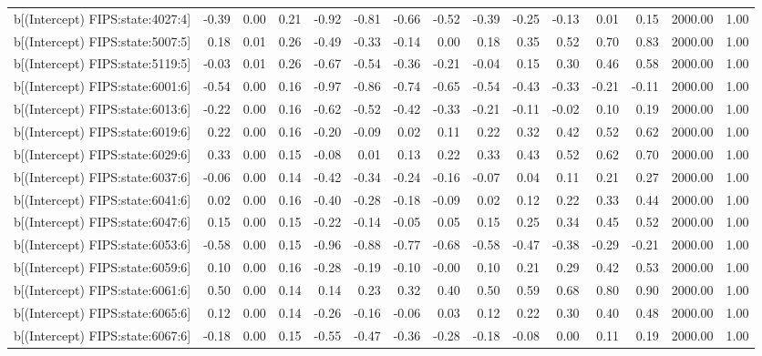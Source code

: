 \begin{table}[ht]
\begin{tabular}{rrrrrrrrrrrrrrr}
  b[(Intercept) FIPS:state:4027:4] & -0.39 & 0.00 & 0.21 & -0.92 & -0.81 & -0.66 & -0.52 & -0.39 & -0.25 & -0.13 & 0.01 & 0.15 & 2000.00 & 1.00 \\ 
  b[(Intercept) FIPS:state:5007:5] & 0.18 & 0.01 & 0.26 & -0.49 & -0.33 & -0.14 & 0.00 & 0.18 & 0.35 & 0.52 & 0.70 & 0.83 & 2000.00 & 1.00 \\ 
  b[(Intercept) FIPS:state:5119:5] & -0.03 & 0.01 & 0.26 & -0.67 & -0.54 & -0.36 & -0.21 & -0.04 & 0.15 & 0.30 & 0.46 & 0.58 & 2000.00 & 1.00 \\ 
  b[(Intercept) FIPS:state:6001:6] & -0.54 & 0.00 & 0.16 & -0.97 & -0.86 & -0.74 & -0.65 & -0.54 & -0.43 & -0.33 & -0.21 & -0.11 & 2000.00 & 1.00 \\ 
  b[(Intercept) FIPS:state:6013:6] & -0.22 & 0.00 & 0.16 & -0.62 & -0.52 & -0.42 & -0.33 & -0.21 & -0.11 & -0.02 & 0.10 & 0.19 & 2000.00 & 1.00 \\ 
  b[(Intercept) FIPS:state:6019:6] & 0.22 & 0.00 & 0.16 & -0.20 & -0.09 & 0.02 & 0.11 & 0.22 & 0.32 & 0.42 & 0.52 & 0.62 & 2000.00 & 1.00 \\ 
  b[(Intercept) FIPS:state:6029:6] & 0.33 & 0.00 & 0.15 & -0.08 & 0.01 & 0.13 & 0.22 & 0.33 & 0.43 & 0.52 & 0.62 & 0.70 & 2000.00 & 1.00 \\ 
  b[(Intercept) FIPS:state:6037:6] & -0.06 & 0.00 & 0.14 & -0.42 & -0.34 & -0.24 & -0.16 & -0.07 & 0.04 & 0.11 & 0.21 & 0.27 & 2000.00 & 1.00 \\ 
  b[(Intercept) FIPS:state:6041:6] & 0.02 & 0.00 & 0.16 & -0.40 & -0.28 & -0.18 & -0.09 & 0.02 & 0.12 & 0.22 & 0.33 & 0.44 & 2000.00 & 1.00 \\ 
  b[(Intercept) FIPS:state:6047:6] & 0.15 & 0.00 & 0.15 & -0.22 & -0.14 & -0.05 & 0.05 & 0.15 & 0.25 & 0.34 & 0.45 & 0.52 & 2000.00 & 1.00 \\ 
  b[(Intercept) FIPS:state:6053:6] & -0.58 & 0.00 & 0.15 & -0.96 & -0.88 & -0.77 & -0.68 & -0.58 & -0.47 & -0.38 & -0.29 & -0.21 & 2000.00 & 1.00 \\ 
  b[(Intercept) FIPS:state:6059:6] & 0.10 & 0.00 & 0.16 & -0.28 & -0.19 & -0.10 & -0.00 & 0.10 & 0.21 & 0.29 & 0.42 & 0.53 & 2000.00 & 1.00 \\ 
  b[(Intercept) FIPS:state:6061:6] & 0.50 & 0.00 & 0.14 & 0.14 & 0.23 & 0.32 & 0.40 & 0.50 & 0.59 & 0.68 & 0.80 & 0.90 & 2000.00 & 1.00 \\ 
  b[(Intercept) FIPS:state:6065:6] & 0.12 & 0.00 & 0.14 & -0.26 & -0.16 & -0.06 & 0.03 & 0.12 & 0.22 & 0.30 & 0.40 & 0.48 & 2000.00 & 1.00 \\ 
  b[(Intercept) FIPS:state:6067:6] & -0.18 & 0.00 & 0.15 & -0.55 & -0.47 & -0.36 & -0.28 & -0.18 & -0.08 & 0.00 & 0.11 & 0.19 & 2000.00 & 1.00 \\ 

\end{tabular}
\end{table}
